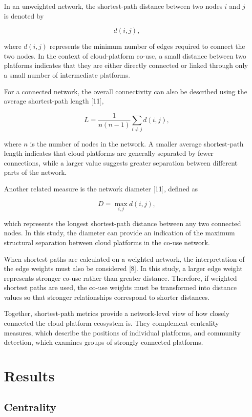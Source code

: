 \documentclass{article}
\begin{document}
\begin{itemize}
{{{In an unweighted network, the shortest-path distance between two nodes $i$ and $j$ is denoted by

\[
d(i,j),
\]

where $d(i,j)$ represents the minimum number of edges required to connect the two nodes. In the context of cloud-platform co-use, a small distance between two platforms indicates that they are either directly connected or linked through only a small number of intermediate platforms.

For a connected network, the overall connectivity can also be described using the average shortest-path length [11],

\[
L =
\frac{1}{n(n-1)}
\sum_{i \neq j} d(i,j),
\]

where $n$ is the number of nodes in the network. A smaller average shortest-path length indicates that cloud platforms are generally separated by fewer connections, while a larger value suggests greater separation between different parts of the network.

Another related measure is the network diameter [11], defined as

\[
D = \max_{i,j} d(i,j),
\]

which represents the longest shortest-path distance between any two connected nodes. In this study, the diameter can provide an indication of the maximum structural separation between cloud platforms in the co-use network.

When shortest paths are calculated on a weighted network, the interpretation of the edge weights must also be considered [8]. In this study, a larger edge weight represents stronger co-use rather than greater distance. Therefore, if weighted shortest paths are used, the co-use weights must be transformed into distance values so that stronger relationships correspond to shorter distances.

Together, shortest-path metrics provide a network-level view of how closely connected the cloud-platform ecosystem is. They complement centrality measures, which describe the positions of individual platforms, and community detection, which examines groups of strongly connected platforms.
}




\section{Results}

\subsection{Centrality}

}}
\end{itemize}
\end{document}
